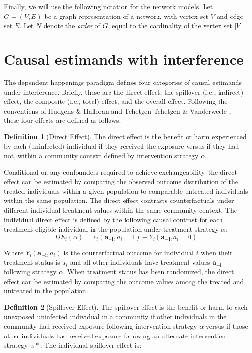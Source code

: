 \documentclass{article}
\theoremstyle{definition}
\newtheorem{definition}{Definition}[section]
\begin{document}
Finally, we will use the following notation for the network models. Let $G=(V,E)$ be a graph representation of a network, with vertex set $V$ and edge set $E$. Let $N$ denote the \textit{order} of $G$, equal to the cardinality of the vertex set $\vert V \vert$.

\section{Causal estimands with interference}
The dependent happenings paradigm defines four categories of causal estimands under interference. Briefly, these are the direct effect, the spillover (i.e., indirect) effect, the composite (i.e., total) effect, and the overall effect. Following the conventions of Hudgens \& Halloran \cite{hudgens_toward_2008} and Tchetgen Tchetgen \& Vanderweele \cite{tchetgen_tchetgen_causal_2012}, these four effects are defined as follows. 

\begin{definition}[Direct Effect]The direct effect is the benefit or harm experienced by each (uninfected) individual if they received the exposure versus if they had not, within a community context defined by intervention strategy $\alpha$. 
\end{definition}
Conditional on any confounders required to achieve exchangeability, the direct effect can be estimated by comparing the observed outcome distribution of the treated individuals within a given population to comparable untreated individuals within the same population. The direct effect contrasts counterfactuals under different individual treatment values within the same community context. The individual direct effect is defined by the following causal contrast for each treatment-eligible individual in the population under treatment strategy $\alpha$:
\begin{equation}\label{eq:1}
   DE_{i}\left(\alpha\right) = Y_{i}\left(\mathbf{a_{-i}}, a_{i} = 1\right) - Y_{i}\left(\mathbf{a_{-i}}, a_{i} = 0\right)	
\end{equation}
	
Where $Y_{i}(\mathbf{a_{-i}},a_{i})$ is the counterfactual outcome for individual $i$ when their treatment status is $a_{i}$ and all other individuals have treatment values $\mathbf{a_{-i}}$ following strategy $\alpha$. When treatment status has been randomized, the direct effect can be estimated by comparing the outcome values among the treated and untreated in the population. 

\begin{definition}[Spillover Effect] The spillover effect is the benefit or harm to each unexposed uninfected individual in a community if other individuals in the community had received exposure following intervention strategy $\alpha$ versus if those other individuals had received exposure following an alternate intervention strategy $\alpha*$. The individual spillover effect is:
\end{definition}
\end{document}
